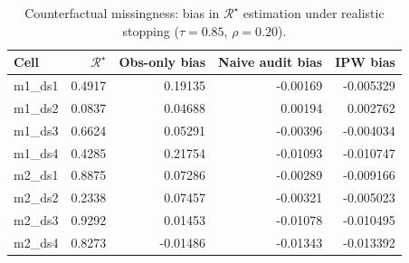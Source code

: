 \begin{table}[ht]
\centering
\small
\begin{tabular}{lrrrr}
\toprule
Cell & $\mathcal{R}^\star$ & Obs-only bias & Naive audit bias & IPW bias \\
\midrule
m1\_ds1 & 0.4917 & 0.19135 & -0.00169 & -0.005329 \\
m1\_ds2 & 0.0837 & 0.04688 & 0.00194 & 0.002762 \\
m1\_ds3 & 0.6624 & 0.05291 & -0.00396 & -0.004034 \\
m1\_ds4 & 0.4285 & 0.21754 & -0.01093 & -0.010747 \\
m2\_ds1 & 0.8875 & 0.07286 & -0.00289 & -0.009166 \\
m2\_ds2 & 0.2338 & 0.07457 & -0.00321 & -0.005023 \\
m2\_ds3 & 0.9292 & 0.01453 & -0.01078 & -0.010495 \\
m2\_ds4 & 0.8273 & -0.01486 & -0.01343 & -0.013392 \\
\bottomrule
\end{tabular}
\caption{Counterfactual missingness: bias in $\mathcal{R}^\star$ estimation under realistic stopping ($\tau=0.85$, $\rho=0.20$).}
\label{tab:a02_missingness}
\end{table}